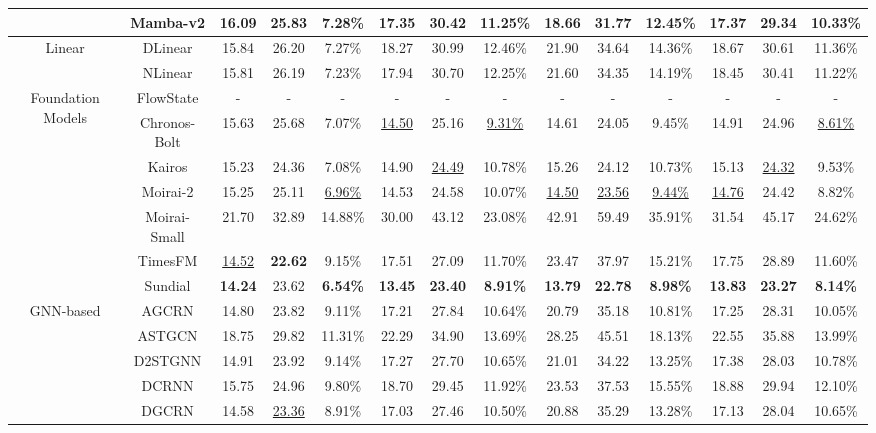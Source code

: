 \begin{table}[t]
{\begin{tabular}{c|c|c|c|c|c|c|c|c|c|c|c|c|c}
 & Mamba-v2 & 16.09 & 25.83 & 7.28\% & 17.35 & 30.42 & 11.25\% & 18.66 & 31.77 & 12.45\% & 17.37 & 29.34 & 10.33\% \\
\midrule
\multirow{2}{*}{Linear} & DLinear & 15.84 & 26.20 & 7.27\% & 18.27 & 30.99 & 12.46\% & 21.90 & 34.64 & 14.36\% & 18.67 & 30.61 & 11.36\% \\
 & NLinear & 15.81 & 26.19 & 7.23\% & 17.94 & 30.70 & 12.25\% & 21.60 & 34.35 & 14.19\% & 18.45 & 30.41 & 11.22\% \\
\midrule
\multirow{7}{*}{Foundation Models} & FlowState & - & - & - & - & - & - & - & - & - & - & - & - \\
 & Chronos-Bolt & 15.63 & 25.68 & 7.07\% & \underline{14.50} & 25.16 & \underline{9.31\%} & 14.61 & 24.05 & 9.45\% & 14.91 & 24.96 & \underline{8.61\%} \\
 & Kairos & 15.23 & 24.36 & 7.08\% & 14.90 & \underline{24.49} & 10.78\% & 15.26 & 24.12 & 10.73\% & 15.13 & \underline{24.32} & 9.53\% \\
 & Moirai-2 & 15.25 & 25.11 & \underline{6.96\%} & 14.53 & 24.58 & 10.07\% & \underline{14.50} & \underline{23.56} & \underline{9.44\%} & \underline{14.76} & 24.42 & 8.82\% \\
 & Moirai-Small & 21.70 & 32.89 & 14.88\% & 30.00 & 43.12 & 23.08\% & 42.91 & 59.49 & 35.91\% & 31.54 & 45.17 & 24.62\% \\
 & TimesFM & \underline{14.52} & \textbf{22.62} & 9.15\% & 17.51 & 27.09 & 11.70\% & 23.47 & 37.97 & 15.21\% & 17.75 & 28.89 & 11.60\% \\
 & Sundial & \textbf{14.24} & 23.62 & \textbf{6.54\%} & \textbf{13.45} & \textbf{23.40} & \textbf{8.91\%} & \textbf{13.79} & \textbf{22.78} & \textbf{8.98\%} & \textbf{13.83} & \textbf{23.27} & \textbf{8.14\%} \\
\midrule
\multirow{10}{*}{GNN-based} & AGCRN & 14.80 & 23.82 & 9.11\% & 17.21 & 27.84 & 10.64\% & 20.79 & 35.18 & 10.81\% & 17.25 & 28.31 & 10.05\% \\
 & ASTGCN & 18.75 & 29.82 & 11.31\% & 22.29 & 34.90 & 13.69\% & 28.25 & 45.51 & 18.13\% & 22.55 & 35.88 & 13.99\% \\
 & D2STGNN & 14.91 & 23.92 & 9.14\% & 17.27 & 27.70 & 10.65\% & 21.01 & 34.22 & 13.25\% & 17.38 & 28.03 & 10.78\% \\
 & DCRNN & 15.75 & 24.96 & 9.80\% & 18.70 & 29.45 & 11.92\% & 23.53 & 37.53 & 15.55\% & 18.88 & 29.94 & 12.10\% \\
 & DGCRN & 14.58 & \underline{23.36} & 8.91\% & 17.03 & 27.46 & 10.50\% & 20.88 & 35.29 & 13.28\% & 17.13 & 28.04 & 10.65\% \\

\end{tabular}}
\end{table}
